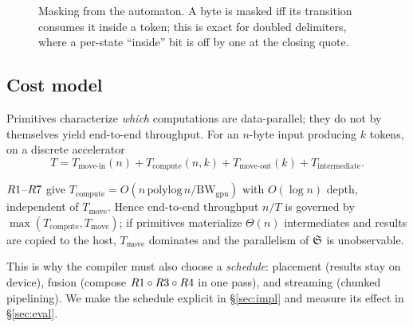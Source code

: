\begin{figure}[t]
\centering
{}
\caption{Masking from the automaton.  A byte is masked iff its transition
consumes it inside a token; this is exact for doubled delimiters, where a
per-state ``inside'' bit is off by one at the closing quote.}
\label{fig:mask}
\end{figure}

\subsection{Cost model}
\label{sec:cost}

Primitives characterize \emph{which} computations are data-parallel; they do not
by themselves yield end-to-end throughput.  For an $n$-byte input producing $k$
tokens, on a discrete accelerator
\[
  T = T_{\mathrm{move\text{-}in}}(n) + T_{\mathrm{compute}}(n,k)
      + T_{\mathrm{move\text{-}out}}(k) + T_{\mathrm{intermediate}} .
\]

\begin{proposition}
$R1$--$R7$ give $T_{\mathrm{compute}} =
O(n\,\mathrm{polylog}\,n / \mathrm{BW}_{\mathrm{gpu}})$ with $O(\log n)$ depth,
independent of $T_{\mathrm{move}}$.  Hence end-to-end throughput $n/T$ is
governed by $\max(T_{\mathrm{compute}}, T_{\mathrm{move}})$; if primitives
materialize $\Theta(n)$ intermediates and results are copied to the host,
$T_{\mathrm{move}}$ dominates and the parallelism of $\mathfrak{S}$ is unobservable.
\end{proposition}

This is why the compiler must also choose a \emph{schedule}: placement (results
stay on device), fusion (compose $R1\circ R3\circ R4$ in one pass), and
streaming (chunked pipelining).  We make the schedule explicit in
\S\ref{sec:impl} and measure its effect in \S\ref{sec:eval}.
